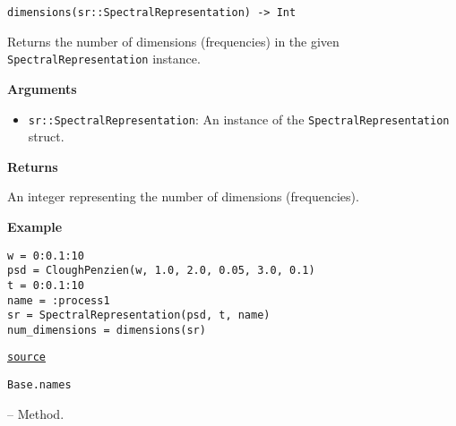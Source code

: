 \begin{adjustwidth}{2em}{0pt}


\begin{verbatim}
dimensions(sr::SpectralRepresentation) -> Int
\end{verbatim}

Returns the number of dimensions (frequencies) in the given \texttt{SpectralRepresentation} instance.

\textbf{Arguments}

\begin{itemize}
\item \texttt{sr::SpectralRepresentation}: An instance of the \texttt{SpectralRepresentation} struct.

\end{itemize}
\textbf{Returns}

An integer representing the number of dimensions (frequencies).

\textbf{Example}


\begin{verbatim}
w = 0:0.1:10
psd = CloughPenzien(w, 1.0, 2.0, 0.05, 3.0, 0.1)
t = 0:0.1:10
name = :process1
sr = SpectralRepresentation(psd, t, name)
num_dimensions = dimensions(sr)
\end{verbatim}



\href{https://github.com/friesischscott/UncertaintyQuantification.jl/blob/f5ee6cce729f0d6a57979257379c942cdf42f86f/src/inputs/stochasticprocesses/spectralrepresentation.jl#L194-L215}{\texttt{source}}


\end{adjustwidth}
\hypertarget{9389867473198091497}{\texttt{Base.names}}  -- {Method.}


